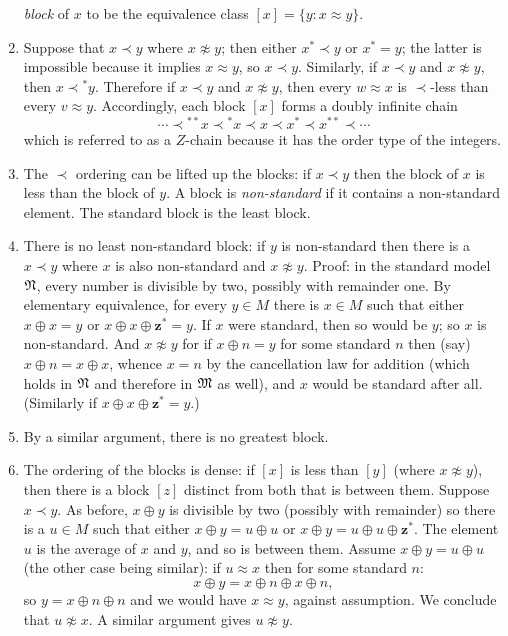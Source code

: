 \documentclass[../../include/open-logic-section]{subfiles}
\begin{document}
\begin{enumerate}
  \emph{block} of $x$ to be the equivalence class $[x] = \{y: x
  \approx y \}$.
\item Suppose that $x \prec y$ where $x \not\approx y$; then either
  $x^* \prec y$ or $x^* = y$; the latter is impossible because it
  implies $x \approx y$, so $x \prec y$. Similarly, if $x \prec y$ and
  $x \not\approx y$, then $x \prec {^*y}$. Therefore if $x \prec y$
  and $x \not\approx y$, then every $w \approx x$ is $\prec$-less than
  every $v \approx y$. Accordingly, each block $[x]$ forms a doubly
  infinite chain
  \[
  \cdots \prec  {^{**}x} \prec {^*}x \prec x \prec x^* \prec x^{**}
  \prec \cdots
  \]
  which is referred to as a $Z$-chain because it has the order type of
  the integers.
\item The $\prec$ ordering can be lifted up the blocks: if $x \prec y$
  then the block of $x$ is less than the block of $y$. A block is
  \emph{non-standard} if it contains a non-standard element. The
  standard block is the least block.
\item There is no least non-standard block: if $y$ is non-standard
  then there is a $x \prec y$ where $x$ is also non-standard and $x
  \not\approx y$. Proof: in the standard model $\mathfrak N$, every
  number is divisible by two, possibly with remainder one. By
  elementary equivalence, for every $y \in M$ there is $x \in M$ such
  that either $x \oplus x = y$ or  $x \oplus x \oplus
  \mathbf{z}^*= y$. If $x$ were standard, then so would be $y$; so $x$
  is non-standard. And $x \not\approx y$ for if $x \oplus n = y$
  for some standard $n$ then (say) $x \oplus n = x \oplus x$, whence
  $x = n$ by the cancellation law for addition (which holds in
  $\mathfrak N$ and therefore in $\mathfrak M$ as well), and $x$
  would be standard after all. (Similarly if  $x \oplus x \oplus
  \mathbf{z}^*= y$.)
\item By a similar argument, there is no greatest block.
\item The ordering of the blocks is dense: if $[x]$ is less than $[y]$
  (where $x \not\approx y$), then there is a block $[z]$ distinct from
  both that is between them. Suppose $x \prec y$. As before, $x
  \oplus y$ is divisible by two (possibly with remainder) so there
  is a $u \in M$ such that either $x \oplus y = u \oplus u$ or
  $x \oplus y = u \oplus u \oplus \mathbf{z}^*$. The element
  $u$ is the average of $x$ and $y$, and so is between them. Assume $x
  \oplus y = u \oplus u$ (the other case being similar): if $u
  \approx x$ then for some standard $n$:
  \[
  x \oplus y = x \oplus n \oplus x \oplus n,
  \]
  so $y = x \oplus n \oplus n$ and we would have $x \approx y$,
  against assumption. We conclude that $u \not\approx x$. A similar
  argument gives $u \not\approx y$.
\end{enumerate}
\end{document}
